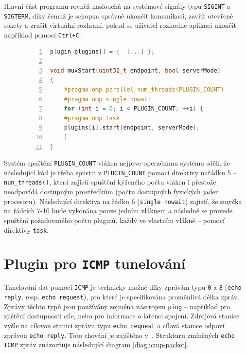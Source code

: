 \documentclass[thesis=M,czech]{FITthesis}[2012/10/20]
\begin{document}
Hlavní část programu rovněž naslouchá na systémové signály typu \texttt{SIGINT} a \texttt{SIGTERM}, díky čemuž je schopna správně ukončit komunikaci, zavřít otevřené sokety a zrušit virtuální rozhraní, pokud se uživatel rozhodne aplikaci ukončit například pomocí \texttt{Ctrl+C}.

    \begin{figure}[h]
	\begin{lstlisting}[caption=Výňatek souboru \texttt{src/mux.c} znázorňující jednoduchost užití knihovny \texttt{OpenMP} pro správu vláken pluginů,language=c,frame=single,numbers=left]
plugin plugins[] = {  [...] };

void muxStart(uint32_t endpoint, bool serverMode)
{
    #pragma omp parallel num_threads(PLUGIN_COUNT)
    #pragma omp single nowait
    for (int i = 0; i < PLUGIN_COUNT; ++i) {
	#pragma omp task
	plugins[i].start(endpoint, serverMode);
    }
}
      \end{lstlisting}
      \label{code:mux-start}
    \end{figure}
    
Systém spuštění \texttt{PLUGIN\_COUNT} vláken nejprve operačnímu systému sdělí, že následující kód je třeba spustit v \texttt{PLUGIN\_COUNT} pomocí direktivy nařádku 5 -- \texttt{nun\_threads()}, která zajistí spuštění kýženého počtu vláken i přestože neodpovídá dostupným prostředkům (počtu dostupných fyzických jader procesoru). Následující direktiva na řádku 6 (\texttt{single nowait}) zajistí, že smyčka na řádcích 7-10 bude vykonána pouze jedním vláknem a následně se provede spuštění požadovaného počtu pluginů, každý ve vlastním vlákně -- pomocí direktivy \texttt{task}.


\section{Plugin pro \texttt{ICMP} tunelování}

Tunelování dat pomocí \texttt{ICMP} je technicky možné díky zprávám typu \texttt{0} a \texttt{8} (\texttt{echo reply}, resp. \texttt{echo request}), pro které je specifikována proměnlivá délka zpráv. Zprávy těchto typů jsou používány zejména nástrojem \texttt{ping} -- například pro zjištění dostupnosti cíle, nebo pro informace o latenci spojení. Zdrojová stanice vyšle na cílovou stanici zprávu typu \texttt{echo request} a cílová stanice odpoví zprávou \texttt{echo reply}. Toto chování je zajištěno v~\cite[RFC1122]{rfc1122}. Strukturu zmíněných \texttt{echo} \texttt{ICMP} zpráv znázorňuje následující diagram \ref{diag:icmp-packet}.
\end{document}
